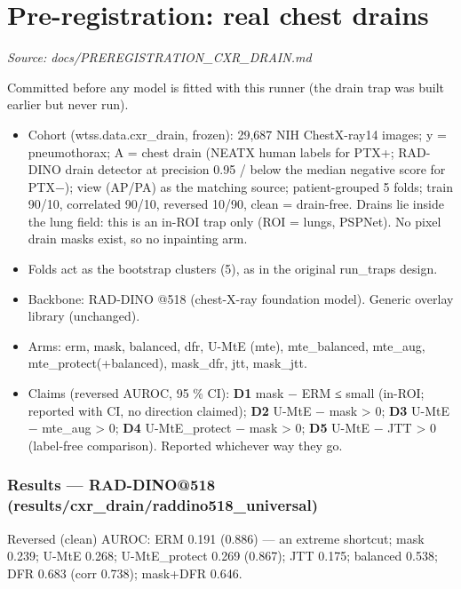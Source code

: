 \section{Pre-registration: real chest drains}\label{doc:PREREGISTRATION_CXR_DRAIN}
\noindent\textit{Source: docs/PREREGISTRATION\_CXR\_DRAIN.md}

{\small
Committed before any model is fitted with this runner (the drain trap was built earlier but never run).

\begin{itemize}

\item
  Cohort (wtss.data.cxr\_drain, frozen): 29,687 NIH ChestX-ray14 images; y = pneumothorax; A = chest drain
  (NEATX human labels for PTX+; RAD-DINO drain detector at precision 0.95 / below the median negative score for
  PTX−); view (AP/PA) as the matching source; patient-grouped 5 folds; train 90/10, correlated 90/10,
  reversed 10/90, clean = drain-free. Drains lie inside the lung field: this is an in-ROI trap only (ROI = lungs,
  PSPNet). No pixel drain masks exist, so no inpainting arm.
\item
  Folds act as the bootstrap clusters (5), as in the original run\_traps design.
\item
  Backbone: RAD-DINO @518 (chest-X-ray foundation model). Generic overlay library (unchanged).
\item
  Arms: erm, mask, balanced, dfr, U-MtE (mte), mte\_balanced, mte\_aug, mte\_protect(+balanced), mask\_dfr, jtt, mask\_jtt.
\item
  Claims (reversed AUROC, 95 \% CI): \textbf{D1} mask − ERM ≤ small (in-ROI; reported with CI, no direction claimed);
  \textbf{D2} U-MtE − mask \textgreater{} 0; \textbf{D3} U-MtE − mte\_aug \textgreater{} 0; \textbf{D4} U-MtE\_protect − mask \textgreater{} 0;
  \textbf{D5} U-MtE − JTT \textgreater{} 0 (label-free comparison). Reported whichever way they go.
\end{itemize}

\subsubsection{Results --- RAD-DINO@518 (results/cxr\_drain/raddino518\_universal)}\label{results--rad-dino518-resultscxr_drainraddino518_universal}

Reversed (clean) AUROC: ERM 0.191 (0.886) --- an extreme shortcut; mask 0.239; U-MtE 0.268; U-MtE\_protect 0.269
(0.867); JTT 0.175; balanced 0.538; DFR 0.683 (corr 0.738); mask+DFR 0.646.

}
